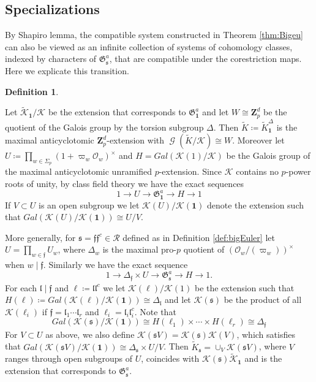 \documentclass[leqno]{amsart}
\theoremstyle{definition}
\newtheorem{defn}[thm]{Definition}
\theoremstyle{remark}
\newcommand{\id}{\mathbf{1}}
\newcommand{\oo}{\mathcal{O}}
\newcommand{\Zp}{\mathbf{Z}_p}
\DeclareMathOperator{\Gal}{\mathcal{G}}
\newcommand{\ff}{\mathfrak{f}}
\newcommand{\fl}{\mathfrak{l}}
\newcommand{\fs}{\mathfrak{s}}
\newcommand{\K}{{\mathcal{K}}} %
\newcommand{\fG}{\mathfrak{G}}
\begin{document}
\subsection{Specializations}

By Shapiro lemma, the compatible system constructed in 
Theorem \ref{thm:Bigeu}
can also be viewed as an infinite collection of systems
of cohomology classes,
indexed by characters of $\fG_\fs^a$,
that are compatible under the corestriction maps.
Here we explicate this transition.


\begin{defn}\label{def:anticyc_extn}

Let $\tilde{\K}_\id/\K$ be the extension 
that corresponds to $\fG_\id^a$
and let $W\cong \Zp^d$ be the quotient 
of the Galois group by the torsion subgroup $\Delta$.
Then $\tilde{K}\coloneqq \tilde{K}_\id^\Delta$
is the maximal anticyclotomic $\Zp^d$-extension
with $\Gal(\tilde{K}/\K)\cong W$.
Moreover let
$U\coloneqq \prod_{w\in\Sigma_p}(1+\varpi_w\oo_w)^\times$
and $H=Gal(\K(1)/\K)$ be the Galois group of 
the maximal anticyclotomic unramified $p$-extension.
Since $\K$ contains no $p$-power roots of unity,
by class field theory we have the exact sequences
\[
    1\to U\to \fG_\id^a\to H\to 1
\]
If $V\subset U$ is an open subgroup
we let $\K(U)/\K(\id)$ denote the extension such that
$Gal(\K(U)/\K(\id))\cong U/V$.


More generally,
for $\fs=\ff\ff^c\in\mathcal{R}$
defined as in Definition \ref{def:bigEuler}
let $U=\prod_{w\in\ff}U_w$,
where $\Delta_w$ is the maximal pro-$p$ quotient of 
$(\oo_w/(\varpi_w))^\times$ when $w\mid \ff$.
Similarly we have the exact sequence
\[
    1\to \Delta_\ff\times U\to \fG_\fs^a\to H\to 1.
\]
For each $\fl\mid\ff$ and $\ell\coloneqq\fl\fl^c$
we let $\K(\ell)/\K(1)$ be the extension 
such that $H(\ell)\coloneqq Gal(\K(\ell)/\K(\id))\cong \Delta_{\fl}$
and let $\K(\fs)$ be the product of all $\K(\ell_i)$
if $\ff=\fl_1\cdots\fl_r$ and $\ell_i=\fl_i\fl_i^c$. Note that 
\[
    Gal(\K(\fs)/\K(\id))\cong 
    H(\ell_1)\times\cdots\times H(\ell_r)\cong \Delta_\ff
\]
For $V\subset U$ as above, 
we also define $\K(\fs V)=\K(\fs)\K(V)$,
which satisfies that 
$Gal(\K(\fs V)/\K(\id))\cong \Delta_{\fs}\times U/V$.
Then $\tilde{K}_\fs=\cup_V \K(\fs V)$,
where $V$ ranges through open subgroups of $U$,
coincides with $\K(\fs)\tilde{\K}_\id$ and
is the extension that corresponds to $\fG_\fs^a$.

\end{defn}
\end{document}
